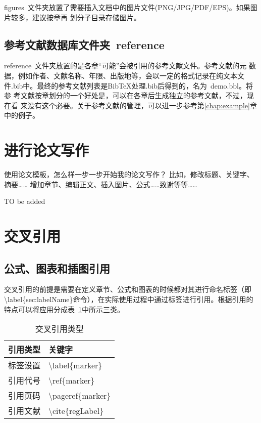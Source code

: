 figures~文件夹放置了需要插入文档中的图片文件(PNG/JPG/PDF/EPS)。如果图片较多，建议按章再
划分子目录存储图片。

\subsection{参考文献数据库文件夹~reference}
\label{sec:bibdir}

reference~文件夹放置的是各章``可能''会被引用的参考文献文件。参考文献的元
数据，例如作者、文献名称、年限、出版地等，会以一定的格式记录在纯文本文
件.bib中。最终的参考文献列表是BibTeX处理.bib后得到的，名为~demo.bbl。将参
考文献按章划分的一个好处是，可以在各章后生成独立的参考文献，不过，现在看
来没有这个必要。关于参考文献的管理，可以进一步参考第\ref{chap:example}章
中的例子。


\section{进行论文写作}
\label{sec:format}

使用论文模板，怎么样一步一步开始我的论文写作？
比如，修改标题、关键字、摘要…… 增加章节、编辑正文、插入图片、公式……致谢等等……


TO be added

\section{交叉引用}
\subsection{公式、图表和插图引用}
\label{sec:refofFigAndTab}
交叉引用的前提是需要在定义章节、公式和图表的时候都对其进行命名标签（即\textbackslash label\{sec:labelName\}命令），在实际使用过程中通过标签进行引用。根据引用的特点可以将应用分成表~\ref{tab:citeType}中所示三类。

\begin{table}[htb]
 \centering
  \caption{交叉引用类型}       %
  \label{tab:citeType}    %
  \begin{tabular}{cl}
    \hline
    引用类型     & 关键字     \\
    \hline
    标签设置        & \textbackslash label\{marker\}  \\
    引用代号        & \textbackslash ref\{marker\}    \\
    引用页码        & \textbackslash pageref\{marker\} \\
    引用文献        & \textbackslash cite\{regLabel\} \\
    \hline
  \end{tabular}
\end{table}

